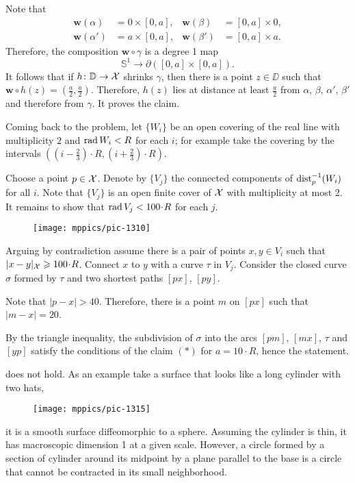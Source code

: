 Note that 
\begin{align*}
\bm{w}(\alpha)&=0\times [0,a],
&
\bm{w}(\beta)&=[0,a]\times 0,
\\
\bm{w}(\alpha')&=a\times [0,a],
&
\bm{w}(\beta')&=[0,a]\times a.
\end{align*} 
Therefore, the composition $\bm{w}\circ\gamma$ is a degree 1 map 
\[\mathbb{S}^1\to \partial([0,a]\times[0,a]).\] 
It follows that if $h\colon\mathbb{D}\to \mathcal{X}$ shrinks $\gamma$, then there is a point $z\in\DD$ such that 
$\bm{w}\circ h(z)=(\tfrac a2,\tfrac a2)$.
Therefore, $h(z)$ lies at distance at least $\tfrac a2$ from $\alpha$, $\beta$, $\alpha'$, $\beta'$
and therefore from $\gamma$.
It proves the claim.

\medskip

Coming back to the problem, let $\{W_i\}$ be an open covering of the real line with multiplicity $2$ and $\mathop{\rm rad}\nolimits W_i<R$ for each $i$;
for example take the covering by the intervals $((i-\tfrac23)\cdot R,(i+\tfrac23)\cdot R)$.

Choose a point $p\in \mathcal{X}$.
Denote by $\{V_j\}$ the connected components of $\mathrm{dist}_p^{-1}(W_i)$ for all $i$.
Note that $\{V_j\}$ is an open finite cover of $\mathcal{X}$ with multiplicity at most 2.
It remains to show that $\rad V_j<100\cdot R$ for each $j$.

\begin{wrapfigure}{o}{31 mm}
\vskip-2mm
\centering
\texttt{[image: mppics/pic-1310]}
\end{wrapfigure}

Arguing by contradiction assume there is a pair of points  $x,y\in V_i$ 
such that $|x\z-y|_{\spc{X}}\z\ge 100\cdot R$.
Connect $x$ to $y$ with a curve $\tau$ in $V_j$.
Consider the closed curve $\sigma$ formed by $\tau$ and two shortest paths $[px]$, $[py]$.


Note that $|p-x|>40$.
Therefore, there is a point $m$ on $[px]$ such that $|m-x|=20$.

By the triangle inequality, the subdivision of $\sigma$ into the arcs $[pm]$, $[mx]$, $\tau$ and $[yp]$ satisfy the conditions of the claim $({*})$ for $a=10\cdot R$,
hence the statement.

 does not hold.
As an example take a surface that looks like a long cylinder with two hats,
\begin{figure}[h!]
\vskip0mm
\centering
\texttt{[image: mppics/pic-1315]}
\end{figure}
it is a smooth surface diffeomorphic to a sphere.
Assuming the cylinder is thin, it has macroscopic dimension 1 at a given scale.
However, a circle formed by a section of cylinder around its midpoint by a plane parallel to the base is a circle that cannot be contracted in its small neighborhood.


